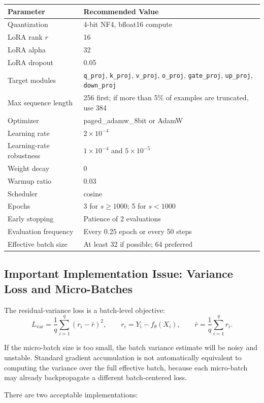 \documentclass[11pt]{article}
\begin{document}
\begin{longtable}{p{}p{}}
\toprule
Parameter & Recommended Value \\
\midrule
Quantization & 4-bit NF4, bfloat16 compute \\
LoRA rank $r$ & 16 \\
LoRA alpha & 32 \\
LoRA dropout & 0.05 \\
Target modules & \texttt{q\_proj}, \texttt{k\_proj}, \texttt{v\_proj}, \texttt{o\_proj}, \texttt{gate\_proj}, \texttt{up\_proj}, \texttt{down\_proj} \\
Max sequence length & 256 first; if more than 5\% of examples are truncated, use 384 \\
Optimizer & paged\_adamw\_8bit or AdamW \\
Learning rate & $2\times 10^{-4}$ \\
Learning-rate robustness & $1\times 10^{-4}$ and $5\times 10^{-5}$ \\
Weight decay & 0 \\
Warmup ratio & 0.03 \\
Scheduler & cosine \\
Epochs & 3 for $s\geq 1000$; 5 for $s<1000$ \\
Early stopping & Patience of 2 evaluations \\
Evaluation frequency & Every 0.25 epoch or every 50 steps \\
Effective batch size & At least 32 if possible; 64 preferred \\
\bottomrule
\end{longtable}

\subsection{Important Implementation Issue: Variance Loss and Micro-Batches}

The residual-variance loss is a batch-level objective:
\[
L_{\mathrm{var}}
=
\frac{1}{q}\sum_{i=1}^{q}(r_i-\bar r)^2,
\qquad
r_i=Y_i-f_\theta(X_i),
\qquad
\bar r=\frac{1}{q}\sum_{i=1}^{q} r_i.
\]

If the micro-batch size is too small, the batch variance estimate will be noisy and unstable. Standard gradient accumulation is not automatically equivalent to computing the variance over the full effective batch, because each micro-batch may already backpropagate a different batch-centered loss.

There are two acceptable implementations:
\end{document}

